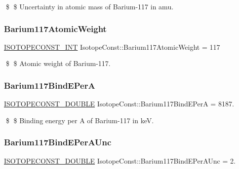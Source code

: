 \$ \$ Uncertainty in atomic mass of Barium-\/117 in amu. \mbox{\label{group___isotope_const-_barium-_ba117_gaf6daa2e9b526404340aab3cd645f2d76}} 
\subsubsection{\texorpdfstring{Barium117\+Atomic\+Weight}{Barium117AtomicWeight}}
{\footnotesize\ttfamily \mbox{\hyperlink{group___isotope_const-_macros_ga5f18360b3e99483a35c32d789e62621c}{I\+S\+O\+T\+O\+P\+E\+C\+O\+N\+S\+T\+\_\+\+I\+NT}} Isotope\+Const\+::\+Barium117\+Atomic\+Weight = 117}

\$ \$ Atomic weight of Barium-\/117. \mbox{\label{group___isotope_const-_barium-_ba117_gaa4b918e66f6d8ecf332ae23c3ed80ce1}} 
\subsubsection{\texorpdfstring{Barium117\+Bind\+E\+PerA}{Barium117BindEPerA}}
{\footnotesize\ttfamily \mbox{\hyperlink{group___isotope_const-_macros_ga8f45a7272ce02c0b4c65c44636ed719a}{I\+S\+O\+T\+O\+P\+E\+C\+O\+N\+S\+T\+\_\+\+D\+O\+U\+B\+LE}} Isotope\+Const\+::\+Barium117\+Bind\+E\+PerA = 8187.}

\$ \$ Binding energy per A of Barium-\/117 in keV. \mbox{\label{group___isotope_const-_barium-_ba117_ga2764ef306a7b01880a9272620d097878}} 
\subsubsection{\texorpdfstring{Barium117\+Bind\+E\+Per\+A\+Unc}{Barium117BindEPerAUnc}}
{\footnotesize\ttfamily \mbox{\hyperlink{group___isotope_const-_macros_ga8f45a7272ce02c0b4c65c44636ed719a}{I\+S\+O\+T\+O\+P\+E\+C\+O\+N\+S\+T\+\_\+\+D\+O\+U\+B\+LE}} Isotope\+Const\+::\+Barium117\+Bind\+E\+Per\+A\+Unc = 2.}

